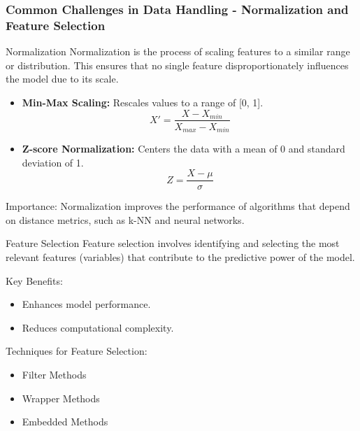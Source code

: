 \documentclass[aspectratio=169]{beamer}
\begin{document}
\begin{frame}[fragile]
    \frametitle{Common Challenges in Data Handling - Normalization and Feature Selection}
    \begin{block}{Normalization}
        Normalization is the process of scaling features to a similar range or distribution. This ensures that no single feature disproportionately influences the model due to its scale.

        \begin{itemize}
            \item \textbf{Min-Max Scaling:} Rescales values to a range of [0, 1].
            \begin{equation}
            X' = \frac{X - X_{min}}{X_{max} - X_{min}}
            \end{equation}
            \item \textbf{Z-score Normalization:} Centers the data with a mean of 0 and standard deviation of 1.
            \begin{equation}
            Z = \frac{X - \mu}{\sigma}
            \end{equation}
        \end{itemize}
        
        Importance: Normalization improves the performance of algorithms that depend on distance metrics, such as k-NN and neural networks.
    \end{block}

    \begin{block}{Feature Selection}
        Feature selection involves identifying and selecting the most relevant features (variables) that contribute to the predictive power of the model.
        
        Key Benefits:
        \begin{itemize}
            \item Enhances model performance.
            \item Reduces computational complexity.
        \end{itemize}

        Techniques for Feature Selection:
        \begin{itemize}
            \item Filter Methods
            \item Wrapper Methods
            \item Embedded Methods
        \end{itemize}
    \end{block}
\end{frame}
\end{document}
